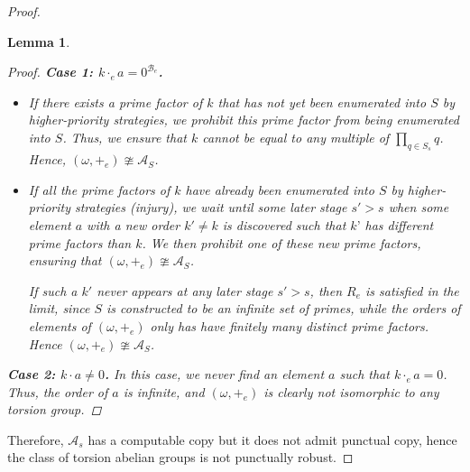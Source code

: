\documentclass{pracalicmgr2025}
\theoremstyle{plain}            %
\newtheorem{lemma}[theorem]{Lemma}
\theoremstyle{remark}           %
\newtheorem{remark}[theorem]{Remark}
\theoremstyle{definition}       %
\begin{document}
\begin{proof}
\begin{lemma}
\begin{proof}
    \textbf{Case 1: $k \cdot_e a = 0^{\mathcal{B}_e}$.}  
    \begin{itemize}
        \item If there exists a prime factor of $k$ that has not yet been enumerated into $S$ by higher-priority strategies, we prohibit this prime factor from being enumerated into $S$. Thus, we ensure that $k$ cannot be equal to any multiple of $\prod_{q \in S_s} q$. Hence, $(\omega, +_e) \ncong \mathcal{A}_S$.
        \item If all the prime factors of $k$ have already been enumerated into $S$ by higher-priority strategies (injury), we wait until some later stage $s' > s$ when some element $a$ with a new order $k' \neq k$ is discovered such that $k’$ has different prime factors than $k$. We then prohibit one of these new prime factors, ensuring that $(\omega, +_e) \ncong \mathcal{A}_S$.  

        If such a $k'$ never appears at any later stage $s' > s$, then $R_e$ is satisfied in the limit, since $S$ is constructed to be an infinite set of primes, while the orders of elements of $(\omega, +_e)$ only has have finitely many distinct prime factors. Hence $(\omega, +_e) \ncong \mathcal{A}_S$.
    \end{itemize}

    \textbf{Case 2: $k \cdot a \neq 0$.}  
    In this case, we never find an element $a$ such that  $k \cdot_e a = 0$. Thus, the order of $a$ is infinite, and $(\omega, +_e)$ is clearly not isomorphic to any torsion group.
\end{proof}
\end{lemma}
Therefore, $\mathcal{A}_s$ has a computable copy but it does not admit punctual copy, hence the class of torsion abelian groups is not punctually robust.

\end{proof}
\end{document}
